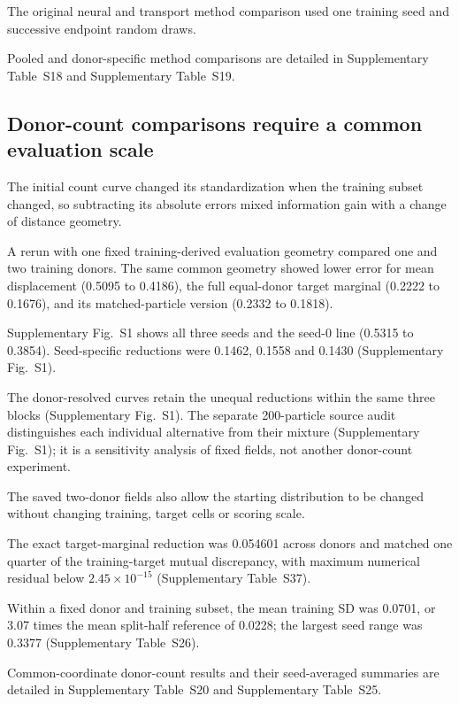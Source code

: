 \documentclass[10pt,a4paper]{article}
\begin{document}
The original neural and transport method comparison used one training seed and successive endpoint random draws.

Pooled and donor-specific method comparisons are detailed in Supplementary Table~S18 and Supplementary Table~S19.

\subsection{Donor-count comparisons require a common evaluation scale}

The initial count curve changed its standardization when the training subset changed, so subtracting its absolute errors mixed information gain with a change of distance geometry.

A rerun with one fixed training-derived evaluation geometry compared one and two training donors. The same common geometry showed lower error for mean displacement (0.5095 to 0.4186), the full equal-donor target marginal (0.2222 to 0.1676), and its matched-particle version (0.2332 to 0.1818).

Supplementary Fig.~S1\label{call:p2f6} shows all three seeds and the seed-0 line (0.5315 to 0.3854). Seed-specific reductions were 0.1462, 0.1558 and 0.1430 (Supplementary Fig.~S1).



The donor-resolved curves retain the unequal reductions within the same three blocks (Supplementary Fig.~S1). The separate 200-particle source audit distinguishes each individual alternative from their mixture (Supplementary Fig.~S1); it is a sensitivity analysis of fixed fields, not another donor-count experiment.

The saved two-donor fields also allow the starting distribution to be changed without changing training, target cells or scoring scale.

The exact target-marginal reduction was 0.054601 across donors and matched one quarter of the training-target mutual discrepancy, with maximum numerical residual below $2.45\times10^{-15}$ (Supplementary Table~S37).

Within a fixed donor and training subset, the mean training SD was 0.0701, or 3.07 times the mean split-half reference of 0.0228; the largest seed range was 0.3377 (Supplementary Table~S26).

Common-coordinate donor-count results and their seed-averaged summaries are detailed in Supplementary Table~S20 and Supplementary Table~S25.
\end{document}
